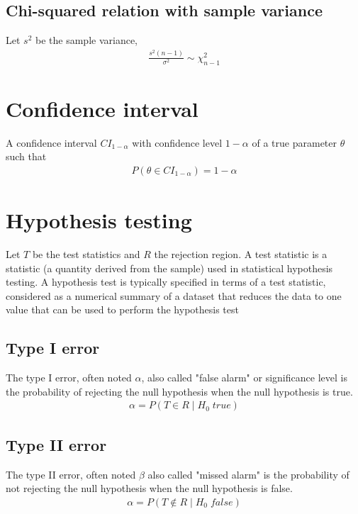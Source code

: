 \documentclass{report}
\begin{document}
\subsection{Chi-squared relation with sample variance}
Let $s^2$ be the sample variance,
\begin{align*}
    \frac{s^2(n-1)}{\sigma^2} \sim \chi_{n-1}^2
\end{align*}

\section{Confidence interval}
A confidence interval $CI_{1-\alpha}$ with confidence level $1-\alpha$ of a true parameter $\theta$
such that
\begin{align*}
    P(\theta \in CI_{1-\alpha}) = 1 - \alpha
\end{align*}

\section{Hypothesis testing}
Let $T$ be the test statistics and $R$ the rejection region.
A test statistic is a statistic (a quantity derived from the sample) used in statistical hypothesis testing.
A hypothesis test is typically specified in terms of a test statistic, considered as a numerical summary
of a dataset that reduces the data to one value that can be used to perform the hypothesis test

\subsection{Type I error}
The type I error, often noted $\alpha$, also called "false alarm" or significance level is the probability
of rejecting the null hypothesis when the null hypothesis is true.
\begin{align*}
    \alpha = P(T \in R\; |\; H_0\; true)
\end{align*}

\subsection{Type II error}
The type II error, often noted $\beta$ also called "missed alarm" is the probability
of not rejecting the null hypothesis when the null hypothesis is false.
\begin{align*}
    \alpha = P(T \notin R\; |\; H_0\; false)
\end{align*}
\end{document}
